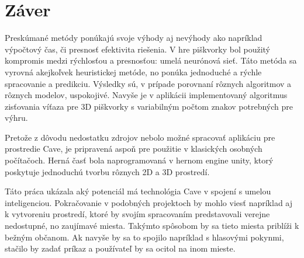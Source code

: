 \section*{Záver}

Preskúmané metódy ponúkajú svoje výhody aj nevýhody ako napríklad výpočtový čas, či presnosť efektivita riešenia.
V hre piškvorky bol použitý kompromis medzi rýchlosťou a presnosťou: umelá neurónová sieť.
Táto metóda sa vyrovná akejkoľvek heuristickej metóde, no ponúka jednoduché a rýchle spracovanie a predikciu.
Výsledky sú, v prípade porovnaní rôznych algoritmov a rôznych modelov, uspokojivé.
Navyše je v aplikácii implementovaný algoritmus zisťovania víťaza pre 3D piškvorky s variabilným počtom znakov
potrebných pre výhru.

Pretože z dôvodu nedostatku zdrojov nebolo možné spracovať aplikáciu pre prostredie Cave, je pripravená aspoň pre
použitie v klasických osobných počítačoch.
Herná časť bola naprogramovaná v hernom engine unity, ktorý poskytuje jednoduchú tvorbu rôznych 2D a 3D prostredí.

Táto práca ukázala aký potenciál má technológia Cave v spojení s umelou inteligenciou.
Pokračovanie v podobných projektoch by mohlo viesť napríklad aj k vytvoreniu prostredí, ktoré by svojím spracovaním
predstavovali verejne nedostupné, no zaujímavé miesta.
Takýmto spôsobom by sa tieto miesta priblíži k bežným občanom.
Ak navyše by sa to spojilo napríklad s hlasovými pokynmi, stačilo by zadať príkaz a používateľ by sa ocitol na inom
mieste.
